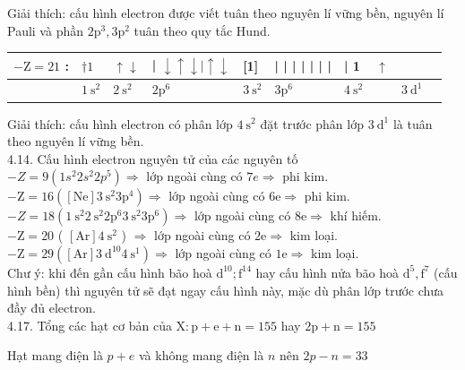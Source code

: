 \documentclass[10pt]{article}
\begin{document}
Giải thích: cấu hình electron được viết tuân theo nguyên lí vững bền, nguyên lí Pauli và phần $2 \mathrm{p}^{3}, 3 \mathrm{p}^{2}$ tuân theo quy tắc Hund.

\begin{center}
\begin{tabular}{|l|l|l|l|l|l|l|l|l|l|}
\hline
\multirow[t]{2}{*}{$-\mathrm{Z}=21$ :} & $\dagger 1$ & $\uparrow \downarrow$ & | $\downarrow \uparrow \downarrow \mid \uparrow \downarrow$ & [1] & | | | | | | | & | 1 & $\uparrow$ &  &  \\
\hline
 & $1 \mathrm{~s}^{2}$ & $2 \mathrm{~s}^{2}$ & $2 \mathrm{p}^{6}$ & $3 \mathrm{~s}^{2}$ & $3 \mathrm{p}^{6}$ & $4 \mathrm{~s}^{2}$ &  & $3 \mathrm{~d}^{1}$ &  \\
\hline
\end{tabular}
\end{center}

Giải thích: cấu hình electron có phân lớp $4 \mathrm{~s}^{2}$ đặt trước phân lớp $3 \mathrm{~d}^{1}$ là tuân theo nguyên lí vững bền.\\
4.14. Cấu hình electron nguyên tử của các nguyên tố\\
$-Z=9\left(1 s^{2} 2 s^{2} 2 p^{5}\right) \Rightarrow$ lớp ngoài cùng có $7 e \Rightarrow$ phi kim.\\
$-\mathrm{Z}=16\left([\mathrm{Ne}] 3 \mathrm{~s}^{2} 3 \mathrm{p}^{4}\right) \Rightarrow$ lớp ngoài cùng có $6 \mathrm{e} \Rightarrow$ phi kim.\\
$-Z=18\left(1 \mathrm{~s}^{2} 2 \mathrm{~s}^{2} 2 \mathrm{p}^{6} 3 \mathrm{~s}^{2} 3 \mathrm{p}^{6}\right) \Rightarrow$ lớp ngoài cùng có $8 \mathrm{e} \Rightarrow$ khí hiếm.\\
$-\mathrm{Z}=20$ ( $[\mathrm{Ar}] 4 \mathrm{~s}^{2}$ ) $\Rightarrow$ lớp ngoài cùng có $2 \mathrm{e} \Rightarrow$ kim loại.\\
$-\mathrm{Z}=29\left([\mathrm{Ar}] 3 \mathrm{~d}^{10} 4 \mathrm{~s}^{1}\right) \Rightarrow$ lớp ngoài cùng có $1 \mathrm{e} \Rightarrow$ kim loại.\\
Chư ý: khi đến gần cấu hình bão hoà $\mathrm{d}^{10} ; \mathrm{f}^{14}$ hay cấu hình nửa bão hoà $\mathrm{d}^{5}, \mathrm{f}^{7}$ (cấu hình bền) thì nguyên tử sẽ đạt ngay cấu hình này, mặc dù phân lớp trước chưa đầy đủ electron.\\
4.17. Tổng các hạt cơ bản của $\mathrm{X}: \mathrm{p}+\mathrm{e}+\mathrm{n}=155$ hay $2 \mathrm{p}+\mathrm{n}=155$

Hạt mang điện là $p+e$ và không mang điện là $n$ nên $2 p-n=33$
\end{document}
